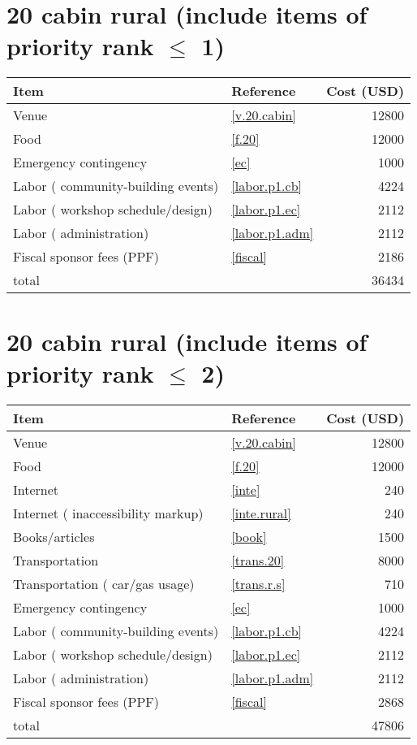 \section*{20 cabin rural (include items of priority rank $\leq$ 1)}
\begin{center}
\begin{tabular}{llr}
Item & Reference & Cost (USD) \\ \hline
Venue & \ref{v.20.cabin} & 12800 \\
Food & \ref{f.20} & 12000 \\
Emergency contingency & \ref{ec} & 1000 \\
Labor ( community-building events) & \ref{labor.p1.cb} & 4224 \\
Labor ( workshop schedule/design) & \ref{labor.p1.ec} & 2112 \\
Labor ( administration) & \ref{labor.p1.adm} & 2112 \\
Fiscal sponsor fees (PPF) & \ref{fiscal} & 2186 \\ \hline
total &  & 36434
\end{tabular}
\end{center}
\newpage
\section*{20 cabin rural (include items of priority rank $\leq$ 2)}
\begin{center}
\begin{tabular}{llr}
Item & Reference & Cost (USD) \\ \hline
Venue & \ref{v.20.cabin} & 12800 \\
Food & \ref{f.20} & 12000 \\
Internet & \ref{inte} & 240 \\
Internet ( inaccessibility markup) & \ref{inte.rural} & 240 \\
Books/articles & \ref{book} & 1500 \\
Transportation & \ref{trans.20} & 8000 \\
Transportation ( car/gas usage) & \ref{trans.r.s} & 710 \\
Emergency contingency & \ref{ec} & 1000 \\
Labor ( community-building events) & \ref{labor.p1.cb} & 4224 \\
Labor ( workshop schedule/design) & \ref{labor.p1.ec} & 2112 \\
Labor ( administration) & \ref{labor.p1.adm} & 2112 \\
Fiscal sponsor fees (PPF) & \ref{fiscal} & 2868 \\ \hline
total &  & 47806
\end{tabular}
\end{center}
\newpage
